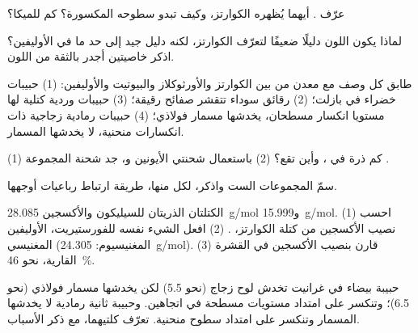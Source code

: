 \begin{exercise}[$\star$]\label{exo:g11:minerals:1}
عرّف  . أيهما يُظهره الكوارتز، وكيف تبدو
سطوحه المكسورة؟ كم  للميكا؟
\end{exercise}

\begin{exercise}[$\star$]\label{exo:g11:minerals:2}
لماذا يكون اللون دليلًا ضعيفًا لتعرّف الكوارتز، لكنه دليل جيد إلى حد ما في
الأوليفين؟ اذكر خاصيتين أجدر بالثقة من اللون.
\end{exercise}

\begin{exercise}[$\star$]\label{exo:g11:minerals:3}
طابق كل وصف مع معدن من بين الكوارتز والأورثوكلاز والبيوتيت
والأوليفين: (1) حبيبات خضراء في بازلت؛ (2) رقائق سوداء تتقشر صفائح
رقيقة؛ (3) حبيبات وردية كتلية لها مستويا انكسار مسطحان، يخدشها
مسمار فولاذي؛ (4) حبيبات رمادية زجاجية ذات انكسارات منحنية، لا يخدشها
المسمار.
\end{exercise}

\begin{exercise}[$\star$]\label{exo:g11:minerals:4}
(1) كم ذرة في ، وأين
تقع؟ (2) باستعمال شحنتي الأيونين  و، جد
شحنة المجموعة .
\end{exercise}

\begin{exercise}[$\star$]\label{exo:g11:minerals:5}
سمّ المجموعات الست  واذكر، لكل منها، طريقة
ارتباط رباعيات أوجهها.
\end{exercise}

\begin{exercise}[$\star\star$]\label{exo:g11:minerals:6}
الكتلتان الذريتان للسيليكون والأكسجين \qty{28.085}{g/mol}
و\qty{15.999}{g/mol}. (1) احسب نصيب الأكسجين من كتلة الكوارتز،
. (2) افعل الشيء نفسه للفورستيريت، الأوليفين المغنيسي
 (المغنيسيوم: \qty{24.305}{g/mol}). (3) قارن بنصيب
الأكسجين في القشرة القارية، نحو \qty{46}{\percent}.
\end{exercise}

\begin{exercise}[$\star\star$]\label{exo:g11:minerals:7}
حبيبة بيضاء في غرانيت تخدش لوح زجاج (نحو 5.5) لكن
يخدشها مسمار فولاذي (نحو 6.5)؛ وتنكسر على امتداد مستويات مسطحة في
اتجاهين. وحبيبة ثانية رمادية لا يخدشها المسمار وتنكسر
على امتداد سطوح منحنية. تعرّف كلتيهما، مع ذكر الأسباب.
\end{exercise}


